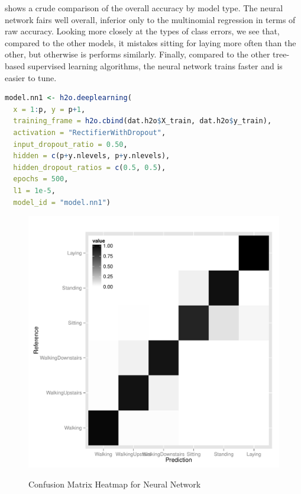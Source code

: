  shows a crude comparison of the overall accuracy by model type.  The neural network fairs well overall, inferior only to the multinomial regression in terms of raw accuracy.  Looking more closely at the types of class errors, we see that, compared to the other models, it mistakes sitting for laying more often than the other, but otherwise is performs similarly.  Finally, compared to the other tree-based supervised learning algorithms, the neural network trains faster and is easier to tune.



\begin{lstlisting}[float,label=lst:neural,caption=Final Deep Learning Configuration, language=R]
model.nn1 <- h2o.deeplearning(
  x = 1:p, y = p+1, 
  training_frame = h2o.cbind(dat.h2o$X_train, dat.h2o$y_train),
  activation = "RectifierWithDropout",
  input_dropout_ratio = 0.50,
  hidden = c(p+y.nlevels, p+y.nlevels),
  hidden_dropout_ratios = c(0.5, 0.5),
  epochs = 500,
  l1 = 1e-5,
  model_id = "model.nn1")
\end{lstlisting}




\begin{figure}[!htb]
  \centering
  \caption{Confusion Matrix Heatmap for Neural Network}
  \includegraphics[scale=.5]{heatmap_nn1.pdf}
  \label{fig:heatmap_nn1}
\end{figure}

